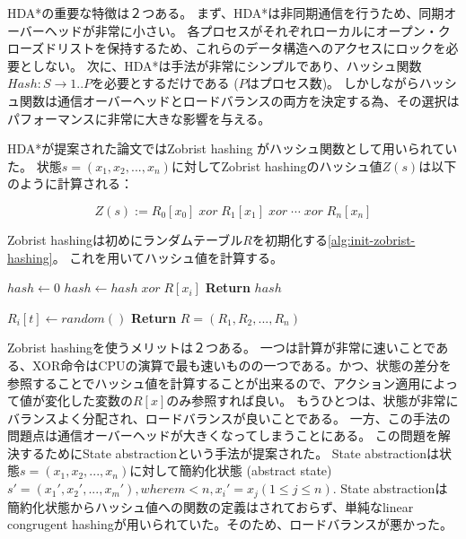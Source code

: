 \documentclass[b5paper]{report}
\newcommand{\ZHDA}{ZHDA*}
\begin{document}
HDA*の重要な特徴は２つある。
まず、HDA*は非同期通信を行うため、同期オーバーヘッドが非常に小さい。
各プロセスがそれぞれローカルにオープン・クローズドリストを保持するため、これらのデータ構造へのアクセスにロックを必要としない。
次に、HDA*は手法が非常にシンプルであり、ハッシュ関数$Hash: S \rightarrow {1..P}$を必要とするだけである ($P$はプロセス数)。
しかしながらハッシュ関数は通信オーバーヘッドとロードバランスの両方を決定する為、その選択はパフォーマンスに非常に大きな影響を与える。


HDA*が提案された論文\cite{kishimotofb13}ではZobrist hashing \cite{zobrist:70}がハッシュ関数として用いられていた。
状態$s = (x_1,x_2,...,x_n)$に対してZobrist hashingのハッシュ値$Z(s)$は以下のように計算される：

\begin{equation}
\label{eq:zobrist}
 	Z(s) := R_{0}[x_{0}]\; xor\; R_{1}[x_{1}]\; xor\; \cdots\; xor\; R_{n}[x_{n}]%
\end{equation}

Zobrist hashingは初めにランダムテーブル$R$を初期化する\ref{alg:init-zobrist-hashing}。
これを用いてハッシュ値を計算する。

\begin{algorithm}
	$hash \leftarrow 0$\;
	 {
		$hash \leftarrow hash \; xor \; R[x_i]$\;
	}
	{\bf Return} $hash$\;
	\caption{\ZHDA{}}
	\label{alg:zobrist-hashing}
\end{algorithm}

\begin{algorithm}
	 {
		 {
			$R_i[t] \leftarrow random()$\;
		}
	}
	{\bf Return} $R = (R_1, R_2,...,R_n)$
	\caption{Initialize \ZHDA{}}
	\label{alg:init-zobrist-hashing}
\end{algorithm}


Zobrist hashingを使うメリットは２つある。
一つは計算が非常に速いことである、XOR命令はCPUの演算で最も速いものの一つである。かつ、状態の差分を参照することでハッシュ値を計算することが出来るので、アクション適用によって値が変化した変数の$R[x]$のみ参照すれば良い。
もうひとつは、状態が非常にバランスよく分配され、ロードバランスが良いことである。
一方、この手法の問題点は通信オーバーヘッドが大きくなってしまうことにある。
この問題を解決するためにState abstractionという手法が提案された\cite{burnslrz10}。
State abstractionは状態$s = (x_1,x_2,...,x_n)$に対して簡約化状態 (abstract state) $s' = (x_1',x_2',...,x_m'), where m < n, x_i' = x_j (1 \leq j \leq n)$. %
State abstractionは簡約化状態からハッシュ値への関数の定義はされておらず、単純なlinear congrugent hashingが用いられていた。そのため、ロードバランスが悪かった。
\end{document}
